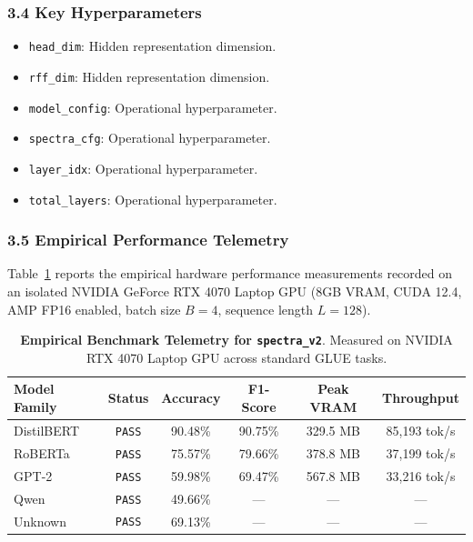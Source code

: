 \subsubsection*{3.4 Key Hyperparameters}
\begin{itemize}
    \item \texttt{head\_dim}: Hidden representation dimension.
    \item \texttt{rff\_dim}: Hidden representation dimension.
    \item \texttt{model\_config}: Operational hyperparameter.
    \item \texttt{spectra\_cfg}: Operational hyperparameter.
    \item \texttt{layer\_idx}: Operational hyperparameter.
    \item \texttt{total\_layers}: Operational hyperparameter.
\end{itemize}

\subsubsection*{3.5 Empirical Performance Telemetry}
Table~\ref{tab:telemetry_spectra_v2} reports the empirical hardware performance measurements recorded on an isolated NVIDIA GeForce RTX 4070 Laptop GPU (8GB VRAM, CUDA 12.4, AMP FP16 enabled, batch size $B=4$, sequence length $L=128$).

\begin{table}[h]
\centering
\small
\caption{\textbf{Empirical Benchmark Telemetry for \texttt{spectra\_v2}}. Measured on NVIDIA RTX 4070 Laptop GPU across standard GLUE tasks.}
\label{tab:telemetry_spectra_v2}
\begin{tabular*}{\columnwidth}{@{\extracolsep{\fill}}lccccc}
\toprule
\textbf{Model Family} & \textbf{Status} & \textbf{Accuracy} & \textbf{F1-Score} & \textbf{Peak VRAM} & \textbf{Throughput} \\
\midrule
DistilBERT & \texttt{PASS} & 90.48\% & 90.75\% & 329.5 MB & 85,193 tok/s \\
RoBERTa & \texttt{PASS} & 75.57\% & 79.66\% & 378.8 MB & 37,199 tok/s \\
GPT-2 & \texttt{PASS} & 59.98\% & 69.47\% & 567.8 MB & 33,216 tok/s \\
Qwen & \texttt{PASS} & 49.66\% & --- & --- & --- \\
Unknown & \texttt{PASS} & 69.13\% & --- & --- & --- \\
\bottomrule
\end{tabular*}
\end{table}

